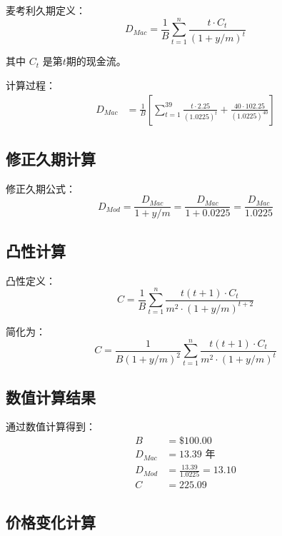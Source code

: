 麦考利久期定义：
\begin{equation}
D_{Mac} = \frac{1}{B} \sum_{t=1}^{n} \frac{t \cdot C_t}{(1+y/m)^t}
\end{equation}

其中 $C_t$ 是第$t$期的现金流。

计算过程：
\begin{align}
D_{Mac} &= \frac{1}{B} \left[ \sum_{t=1}^{39} \frac{t \cdot 2.25}{(1.0225)^t} + \frac{40 \cdot 102.25}{(1.0225)^{40}} \right]
\end{align}

\subsection{修正久期计算}

修正久期公式：
\begin{equation}
D_{Mod} = \frac{D_{Mac}}{1 + y/m} = \frac{D_{Mac}}{1 + 0.0225} = \frac{D_{Mac}}{1.0225}
\end{equation}

\subsection{凸性计算}

凸性定义：
\begin{equation}
C = \frac{1}{B} \sum_{t=1}^{n} \frac{t(t+1) \cdot C_t}{m^2 \cdot (1+y/m)^{t+2}}
\end{equation}

简化为：
\begin{equation}
C = \frac{1}{B(1+y/m)^2} \sum_{t=1}^{n} \frac{t(t+1) \cdot C_t}{m^2 \cdot (1+y/m)^t}
\end{equation}

\subsection{数值计算结果}

通过数值计算得到：
\begin{align}
B &= \$100.00 \\
D_{Mac} &= 13.39 \text{ 年} \\
D_{Mod} &= \frac{13.39}{1.0225} = 13.10 \\
C &= 225.09
\end{align}

\subsection{价格变化计算}


